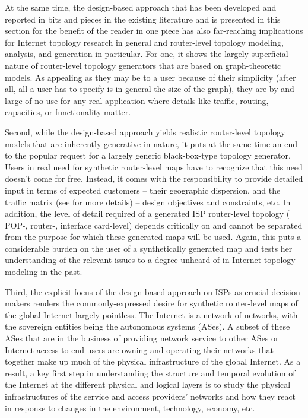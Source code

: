At the same time, the design-based approach that has been developed and reported
in bits and pieces in the existing literature and is presented in this section for
the benefit of the reader in one piece has also far-reaching implications for 
Internet topology research in general and router-level topology modeling, analysis, 
and generation in particular.  For one, it shows the largely superficial nature 
of router-level topology generators that are based on graph-theoretic models.  
As appealing as they may be to a user because of their simplicity (after all, 
all a user has to specify is in general the size of the graph), they are by and 
large of no use for any real application where details like traffic, routing, 
capacities, or functionality matter.   

Second, while the design-based approach yields realistic router-level
topology models that are inherently generative in nature, it puts at
the same time an end to the popular request for a largely generic
black-box-type topology generator.  Users in real need for synthetic
router-level maps have to recognize that this need doesn't come for
free. Instead, it comes with the responsibility to provide detailed
input in terms of expected customers -- their geographic dispersion,
and the traffic matrix (see \cite{tune13:_sigcom_ebook} for more
details) -- design objectives and constraints, etc.  In addition, the
level of detail required of a generated ISP router-level topology (\eg
POP-, router-, interface card-level) depends critically on and cannot
be separated from the purpose for which these generated maps will be
used.  Again, this puts a considerable burden on the user of a
synthetically generated map and tests her understanding of the
relevant issues to a degree unheard of in Internet topology modeling
in the past.

Third, the explicit focus of the design-based approach on ISPs as crucial 
decision makers renders the commonly-expressed desire for synthetic router-level 
maps of the global Internet largely pointless. The Internet is a network of 
networks, with the sovereign entities being the autonomous systems (ASes). A subset
of these ASes that are in the business of providing network service to other ASes
or Internet access to end users are owning and operating their networks that 
together make up much of the physical infrastructure of the global Internet. 
As a result, a key first step in understanding the structure and temporal 
evolution of the Internet at the different physical and logical layers is 
to study the physical infrastructures of the service and access
providers' networks and how they react in response to changes in the
environment, technology, economy, etc.  

